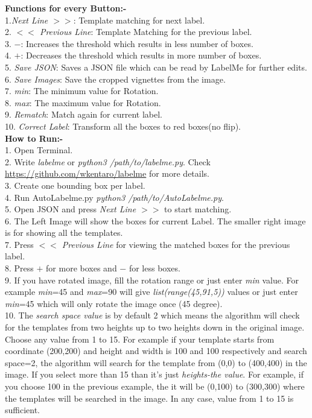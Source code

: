 \documentclass[12pt]{article}
\begin{document}
\textbf{Functions for every Button:-}\\
1.\textit{Next Line $>>$}: Template matching for next label.\\
2. \textit{$<<$ Previous Line}: Template Matching for the previous label.\\
3. $-$: Increases the threshold which results in less number of boxes.\\
4. $+$: Decreases the threshold which results in more number of boxes.\\
5. \textit{Save JSON}: Saves a JSON file which can be read by LabelMe for further edits.\\
6. \textit{Save Images}: Save the cropped vignettes from the image.\\
7. \textit{min}: The minimum value for Rotation.\\
8. \textit{max}: The maximum value for Rotation.\\
9. \textit{Rematch}: Match again for current label.\\
10. \textit{Correct Label}: Transform all the boxes to red boxes(no flip).\\[2em]
\textbf{How to Run:-}\\
1. Open Terminal.\\
2. Write \textit{labelme} or \textit{python3 /path/to/labelme.py}. Check \href {https://github.com/wkentaro/labelme}{https://github.com/wkentaro/labelme} for more details.\\
3. Create one bounding box per label.\\
4. Run AutoLabelme.py \textit{ python3 /path/to/AutoLabelme.py}.\\
5. Open JSON and press \textit{Next Line $>>$} to start matching.\\
6. The Left Image will show the boxes for current Label. The smaller right image is for showing all the templates.\\
7. Press \textit{$<<$ Previous Line} for viewing the matched boxes for the previous label.\\
8. Press $+$ for more boxes and $-$ for less boxes.\\
9. If you have rotated image, fill the rotation range or just enter \textit{min} value. For example \textit{min}=45 and \textit{max}=90 will give \textit{list(range(45,91,5))} values or just enter \textit{min}=45 which will only rotate the image once (45 degree).\\
10. The \textit{search space value} is by default 2 which means the algorithm will check for the templates from two heights up to two heights down in the original image. Choose any value from 1 to 15. For example if your template starts from coordinate (200,200) and height and width is 100 and 100 respectively and search space=2, the algorithm will search for the template from (0,0) to (400,400) in the image. If you select more than 15 than it's just \textit{heights-the value}. For example, if you choose 100 in the previous example, the it will be (0,100) to (300,300) where the templates will be searched in the image. In any case, value from 1 to 15 is sufficient.\\
\end{document}
